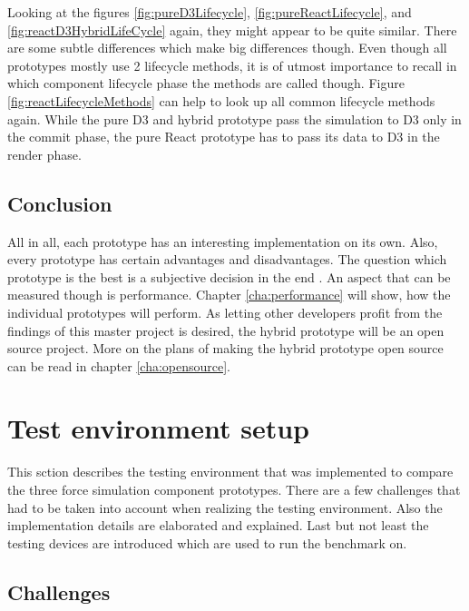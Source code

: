 Looking at the figures \ref{fig:pureD3Lifecycle}, \ref{fig:pureReactLifecycle}, and \ref{fig:reactD3HybridLifeCycle} again, they might appear to be quite similar. There are some subtle differences which make big differences though. Even though all prototypes mostly use 2 lifecycle methods, it is of utmost importance to recall in which component lifecycle phase the methods are called though. Figure \ref{fig:reactLifecycleMethods} can help to look up all common lifecycle methods again. While the pure D3 and hybrid prototype pass the simulation to D3 only in the commit phase, the pure React prototype has to pass its data to D3 in the render phase.

\subsection{Conclusion}

All in all, each prototype has an interesting implementation on its own. Also, every prototype has certain advantages and disadvantages. The question which prototype is the best is a subjective decision in the end . An aspect that can be measured though is performance. Chapter \ref{cha:performance} will show, how the individual prototypes will perform. As letting other developers profit from the findings of this master project is desired, the hybrid prototype will be an open source project. More on the plans of making the hybrid prototype open source can be read in chapter \ref{cha:opensource}.


\section{Test environment setup}

This sction describes the testing environment that was implemented to compare the three force simulation component prototypes. There are a few challenges that had to be taken into account when realizing the testing environment. Also the implementation details are elaborated and explained. Last but not least the testing devices are introduced which are used to run the benchmark on.

\subsection{Challenges}

